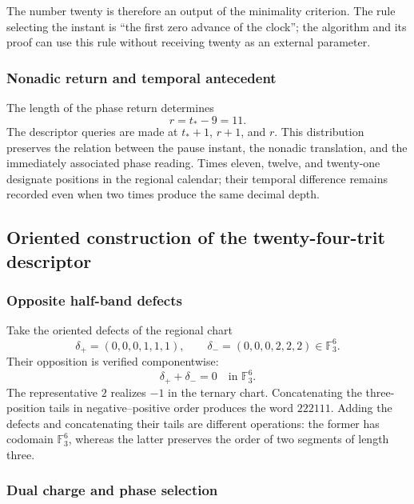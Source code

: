 The number twenty is therefore an output of the minimality criterion. The rule
selecting the instant is ``the first zero advance of the clock''; the
algorithm and its proof can use this rule without receiving twenty as
an external parameter.

\subsubsection{Nonadic return and temporal antecedent}

The length of the phase return determines
\begin{equation}
 r=t_*-9=11.
 \label{act21:eq:kdes-retorno}
\end{equation}
The descriptor queries are made at $t_*+1$, $r+1$, and $r$.
This distribution preserves the relation between the pause instant, the
nonadic translation, and the immediately associated phase reading. Times
eleven, twelve, and twenty-one designate positions in the regional
calendar; their temporal difference remains recorded even when two
times produce the same decimal depth.

\subsection{Oriented construction of the twenty-four-trit descriptor}

\subsubsection{Opposite half-band defects}

Take the oriented defects of the regional chart
\[
 \delta_+=(0,0,0,1,1,1),\qquad
 \delta_-=(0,0,0,2,2,2)\in\mathbb F_3^6.
\]
Their opposition is verified componentwise:
\[
 \delta_++\delta_-=0\quad\text{in }\mathbb F_3^6.
\]
The representative $2$ realizes $-1$ in the ternary chart. Concatenating
the three-position tails in negative--positive order produces
the word $222111$. Adding the defects and concatenating their
tails are different operations: the former has codomain
$\mathbb F_3^6$, whereas the latter preserves the order of two
segments of length three.

\subsubsection{Dual charge and phase selection}

